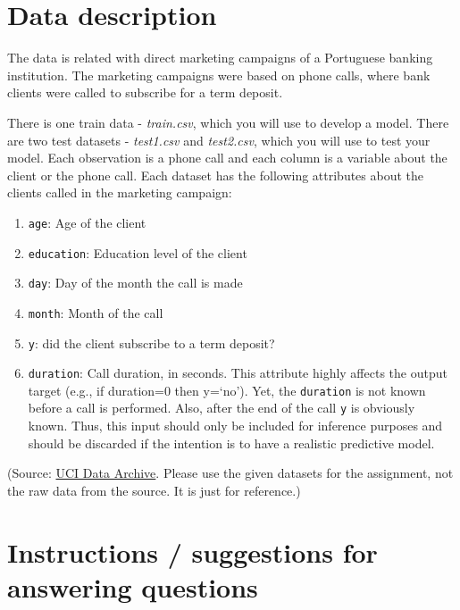 \documentclass[
  letterpaper,
  DIV=11,
  numbers=noendperiod]{scrreprt}
\begin{document}
\section*{Data description}\label{data-description}


The data is related with direct marketing campaigns of a Portuguese
banking institution. The marketing campaigns were based on phone calls,
where bank clients were called to subscribe for a term deposit.

There is one train data - \emph{train.csv}, which you will use to
develop a model. There are two test datasets - \emph{test1.csv} and
\emph{test2.csv}, which you will use to test your model. Each
observation is a phone call and each column is a variable about the
client or the phone call. Each dataset has the following attributes
about the clients called in the marketing campaign:

\begin{enumerate}
\def\labelenumi{\arabic{enumi}.}
\item
  \texttt{age}: Age of the client
\item
  \texttt{education}: Education level of the client
\item
  \texttt{day}: Day of the month the call is made
\item
  \texttt{month}: Month of the call
\item
  \texttt{y}: did the client subscribe to a term deposit?
\item
  \texttt{duration}: Call duration, in seconds. This attribute highly
  affects the output target (e.g., if duration=0 then y=`no'). Yet, the
  \texttt{duration} is not known before a call is performed. Also, after
  the end of the call \texttt{y} is obviously known. Thus, this input
  should only be included for inference purposes and should be discarded
  if the intention is to have a realistic predictive model.
\end{enumerate}

(Source:
\href{https://archive.ics.uci.edu/ml/datasets/bank+marketing}{UCI Data
Archive}. Please use the given datasets for the assignment, not the raw
data from the source. It is just for reference.)

\section*{Instructions / suggestions for answering
questions}\label{instructions-suggestions-for-answering-questions}
\end{document}
